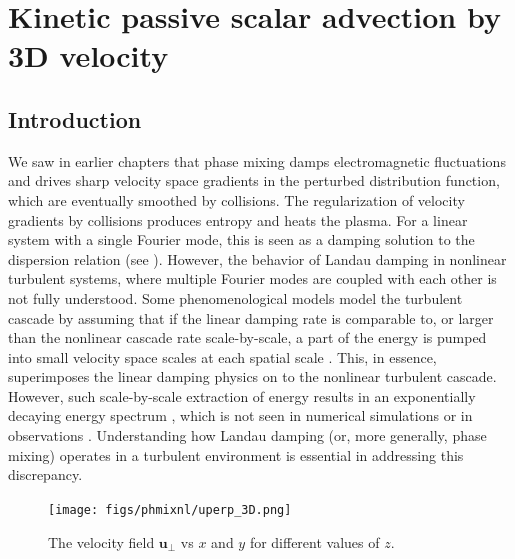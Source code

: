 \chapter{Kinetic passive scalar advection by 3D velocity}
\label{chap:phmixnl}
\section{Introduction}

    We saw in earlier chapters that phase mixing damps electromagnetic fluctuations and
    drives sharp velocity space gradients in the perturbed distribution function, which
    are eventually smoothed by collisions. The regularization of velocity gradients by
    collisions produces entropy and heats the plasma.
    For a linear system with a single Fourier
    mode, this is seen as a damping solution to the dispersion relation (see
    ). However, the behavior of Landau
    damping in nonlinear turbulent systems, where multiple Fourier modes are coupled with
    each other is not fully understood.
    Some phenomenological models model the turbulent cascade by assuming that if the linear
    damping rate is comparable to, or larger than the nonlinear cascade rate
    scale-by-scale, a part of the energy is pumped into small velocity space scales at
    each spatial scale \cite{quataert98, quataert99, howes08jgr}. This, in essence,
    superimposes the linear damping physics on to the nonlinear turbulent cascade.
    However, such scale-by-scale extraction of energy results in an exponentially decaying energy spectrum \cite{gary09,
    podesta10}, which is not seen in numerical simulations \cite{howes08prl,
    barnes11, tenbarge12} or in observations \cite{celnikier83, celnikier87, coles89,
    marsch90, coles91, bershadskii04, hnat05, kellogg05,
    chen11, sahraoui09, alexandrova09, chen10, sahraoui10, alexandrova12, sahraoui13,
    chen13}. Understanding how Landau damping (or, more generally, phase mixing) operates
    in a turbulent environment is essential in addressing this discrepancy.

    \begin{figure}
    \begin{center}
        \texttt{[image: figs/phmixnl/uperp\_3D.png]}
        \caption{The velocity field $\mathbf{u}_\perp$ vs $x$ and $y$ for different values
        of $z$.}
        \label{phmixnl:fig:uperp}
    \end{center}
    \end{figure}
    
